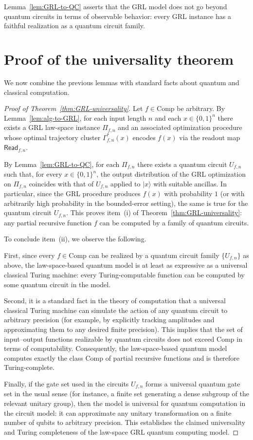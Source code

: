 \documentclass[11pt]{book}
\theoremstyle{plain}
\theoremstyle{definition}
\theoremstyle{remark}
\begin{document}
Lemma~\ref{lem:GRL-to-QC} asserts that the GRL model does not go
beyond quantum circuits in terms of observable behavior: every GRL
instance has a faithful realization as a quantum circuit family.

\section{Proof of the universality theorem}

We now combine the previous lemmas with standard facts about quantum
and classical computation.

\begin{proof}[Proof of Theorem~\ref{thm:GRL-universality}]
Let $f\in\mathrm{Comp}$ be arbitrary. By
Lemma~\ref{lem:alg-to-GRL}, for each input length $n$ and each
$x\in\{0,1\}^n$ there exists a GRL law-space instance $\Pi_{f,n}$ and
an associated optimization procedure whose optimal trajectory cluster
$\Gamma_{f,n}^\ast(x)$ encodes $f(x)$ via the readout map
$\mathsf{Read}_{f,n}$.

By Lemma~\ref{lem:GRL-to-QC}, for each $\Pi_{f,n}$ there exists a
quantum circuit $U_{f,n}$ such that, for every $x\in\{0,1\}^n$, the
output distribution of the GRL optimization on $\Pi_{f,n}$ coincides
with that of $U_{f,n}$ applied to $|x\rangle$ with suitable ancillas.
In particular, since the GRL procedure produces $f(x)$ with
probability $1$ (or with arbitrarily high probability in the
bounded-error setting), the same is true for the quantum circuit
$U_{f,n}$. This proves item~(i) of
Theorem~\ref{thm:GRL-universality}: any partial recursive function
$f$ can be computed by a family of quantum circuits.

To conclude item~(ii), we observe the following.

First, since every $f\in\mathrm{Comp}$ can be realized by a quantum
circuit family $\{U_{f,n}\}$ as above, the law-space-based quantum
model is at least as expressive as a universal classical Turing
machine: every Turing-computable function can be computed by some
quantum circuit in the model.

Second, it is a standard fact in the theory of computation that a
universal classical Turing machine can simulate the action of any
quantum circuit to arbitrary precision (for example, by explicitly
tracking amplitudes and approximating them to any desired finite
precision). This implies that the set of input--output functions
realizable by quantum circuits does not exceed
$\mathrm{Comp}$ in terms of computability. Consequently, the
law-space-based quantum model computes exactly the class
$\mathrm{Comp}$ of partial recursive functions and is therefore
Turing-complete.

Finally, if the gate set used in the circuits $U_{f,n}$ forms a
universal quantum gate set in the usual sense (for instance, a
finite set generating a dense subgroup of the relevant unitary
group), then the model is universal for quantum computation in the
circuit model: it can approximate any unitary transformation on a
finite number of qubits to arbitrary precision. This establishes the
claimed universality and Turing completeness of the law-space GRL
quantum computing model.
\end{proof}
\end{document}
